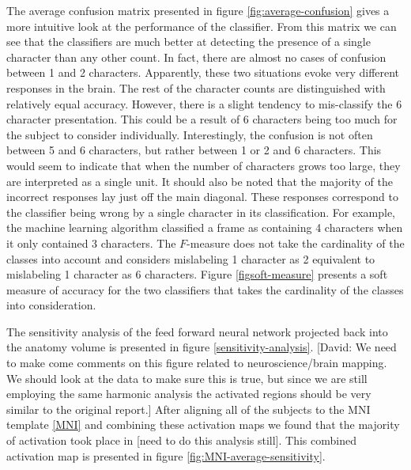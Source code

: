 \documentclass[final]{article}
\begin{document}
The average confusion matrix presented in figure \ref{fig:average-confusion} gives a more intuitive look at the performance of the classifier.
From this matrix we can see that the classifiers are much better at detecting the presence of a single character than any other count.
In fact, there are almost no cases of confusion between 1 and 2 characters.
Apparently, these two situations evoke very different responses in the brain.
The rest of the character counts are distinguished with relatively equal accuracy.
However, there is a slight tendency to mis-classify the 6 character presentation.
This could be a result of 6 characters being too much for the subject to consider individually.
Interestingly, the confusion is not often between 5 and 6 characters, but rather between 1 or 2 and 6 characters.
This would seem to indicate that when the number of characters grows too large, they are interpreted as a single unit.
It should also be noted that the majority of the incorrect responses lay just off the main diagonal.
These responses correspond to the classifier being wrong by a single character in its classification.
For example, the machine learning algorithm classified a frame as containing 4 characters when it only contained 3 characters.
The $F$-measure does not take the cardinality of the classes into account and considers mislabeling 1 character as 2 equivalent to mislabeling 1 character as 6 characters.
Figure \ref{figsoft-measure} presents a soft measure of accuracy for the two classifiers that takes the cardinality of the classes into consideration.

The sensitivity analysis of the feed forward neural network projected back into the anatomy volume is presented in figure \ref{sensitivity-analysis}.
[David: We need to make come comments on this figure related to neuroscience/brain mapping. We should look at the data to make sure this is true, but since we are still employing the same harmonic analysis the activated regions should be very similar to the original report.]
After aligning all of the subjects to the MNI template \ref{MNI} and combining these activation maps we found that the majority of activation took place in [need to do this analysis still].
This combined activation map is presented in figure \ref{fig:MNI-average-sensitivity}.
\end{document}
